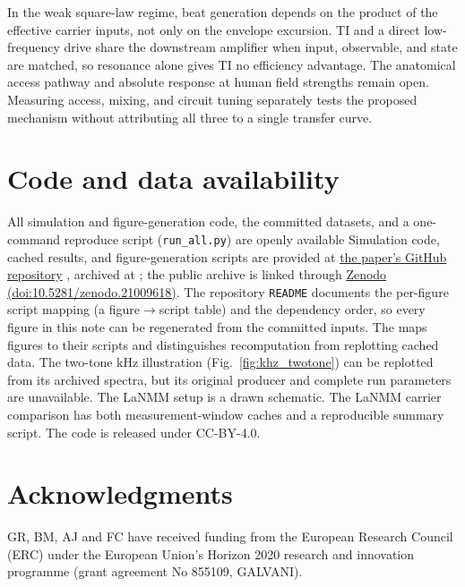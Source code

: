 \documentclass[11pt,a4paper]{article}
\providecommand{\DIFaddtex}[1]{{\protect\color{blue} \sf #1}} %
\providecommand{\DIFdeltex}[1]{{\protect\color{red} \scriptsize #1}} %
\providecommand{\DIFaddbegin}{} %
\providecommand{\DIFaddend}{} %
\providecommand{\DIFdelbegin}{} %
\providecommand{\DIFdelend}{} %
\providecommand{\DIFadd}[1]{\texorpdfstring{\DIFaddtex{#1}}{#1}} %
\providecommand{\DIFdel}[1]{\texorpdfstring{\DIFdeltex{#1}}{}} %
\begin{document}
In the weak square-law regime, beat generation depends on the product of the
effective carrier inputs, not only on the envelope excursion. TI and a direct
low-frequency drive share the downstream amplifier when input, observable, and
state are matched, so resonance alone gives TI no efficiency advantage. The
anatomical access pathway and absolute response at human field strengths remain
open. Measuring access, mixing, and circuit tuning separately tests the proposed
mechanism without attributing all three to a single transfer curve.

\section*{Code and data availability}
\DIFdelbegin \DIFdel{All simulation and figure-generation code, the committed datasets, and a one-command
reproduce script (\texttt{run\_all.py}) are openly available }\DIFdelend \DIFaddbegin \DIFadd{Simulation code, cached results, and figure-generation scripts are provided }\DIFaddend at
\href{https://github.com/giulioruffini/TI-demodulation-paper}{the paper's GitHub repository}\DIFdelbegin \DIFdel{, archived at
}\DIFdelend \DIFaddbegin \DIFadd{;
the public archive is linked through
}\DIFaddend \href{https://doi.org/10.5281/zenodo.21009618}{Zenodo (doi:10.5281/zenodo.21009618)}.
The repository \texttt{README} \DIFdelbegin \DIFdel{documents the per-figure script mapping (a
figure$\rightarrow$script table) and the dependency order, so every figure in this note can be regenerated from the committed inputs. The }\DIFdelend \DIFaddbegin \DIFadd{maps figures to their scripts and distinguishes
recomputation from replotting cached data. The two-tone kHz illustration
(Fig.~\ref{fig:khz_twotone}) can be replotted from its archived spectra, but its
original producer and complete run parameters are unavailable. The LaNMM setup
is a drawn schematic. The LaNMM carrier comparison has both measurement-window
caches and a reproducible summary script. The }\DIFaddend code is released under CC-BY-4.0.

\section*{Acknowledgments}
GR, BM, AJ and FC have received funding from the European Research Council (ERC) under the
European Union's Horizon 2020 research and innovation programme (grant agreement No 855109,
GALVANI).
\end{document}
